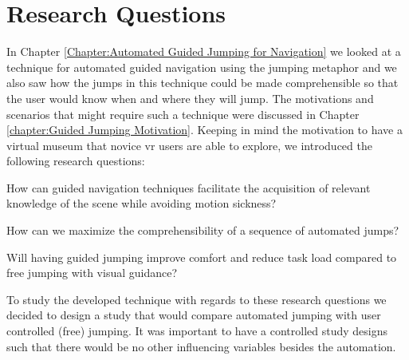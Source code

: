 \label{Chapter:Design and Procedure of the User Study}
\section{Research Questions}
\label{section:DUS Research Questions}
In Chapter \ref{Chapter:Automated Guided Jumping for Navigation} we looked at a technique for automated guided navigation using the jumping metaphor and we also saw how the jumps in this technique could be made comprehensible so that the user would know when and where they will jump. The motivations and scenarios that might require such a technique were discussed in Chapter \ref{chapter:Guided Jumping Motivation}. Keeping in mind the motivation to have a virtual museum that novice \acrshort{vr} users are able to explore, we introduced the following research questions:

\begin{researchq}
	\label{rq:rq1}
	How can guided navigation techniques facilitate the acquisition of relevant knowledge of the scene while avoiding motion sickness?
\end{researchq}
\begin{researchq}
	\label{rq:rq2}
	How can we maximize the comprehensibility of a sequence of automated jumps?
\end{researchq}
\begin{researchq}
	\label{rq:rq3}
	Will having guided jumping improve comfort and reduce task load compared to free jumping with visual guidance?
\end{researchq}
To study the developed technique with regards to these research questions we decided to design a study that would compare automated jumping with user controlled (free) jumping. It was important to have a controlled study designs such that there would be no other influencing variables besides the automation.